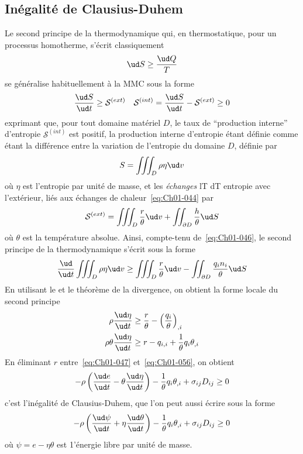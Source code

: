 \subsection{Inégalité de Clausius-Duhem} \label{ssec:Ch01-3.2}
Le second principe de la thermodynamique qui, en thermostatique, pour un processus homotherme, s'écrit classiquement
\begin{equation}
    \ud S \geq \frac{\ud Q}{T}
    \label{eq:Ch01-051}
\end{equation}
se généralise habituellement à la MMC sous la forme 
\begin{equation}
    \frac{\ud S}{\ud t} \geq \mathcal{S}^{(ext)} \quad \mathcal{S}^{(int)} = \frac{\ud S}{\ud t} - \mathcal{S}^{(ext)} \geq 0
    \label{eq:Ch01-052}
\end{equation}
exprimant que, pour tout domaine matériel $D$, le taux de ``production interne'' d'entropie $\mathcal{S}^{(int)}$ est positif, la production interne d'entropie étant définie comme étant la différence entre la variation de l'entropie du domaine $D$, définie par
\begin{equation}
    S = \iiint_{D} \rho \eta \ud v
    \label{eq:Ch01-053}
\end{equation}
où $\eta$ est l'entropie par unité de masse, et les \emph{échanges} lT dT entropie avec l'extérieur, liés aux échanges de chaleur~\eqref{eq:Ch01-044} par
\begin{equation}
    \mathcal{S}^{(ext)} = \iiint_{D} \frac{r}{\theta} \ud v + \iint_{\partial D} \frac{h}{\theta} \ud S
    \label{eq:Ch01-054}
\end{equation}
où $\theta$ est la température absolue.
Ainsi, compte-tenu de~\eqref{eq:Ch01-046}, le second principe de la thermodynamique s'écrit sous la forme
\begin{equation}
    \frac{\ud}{\ud t} \iiint_D \rho \eta \ud v \geq \iiint_{D} \frac{r}{\theta} \ud v - \iint_{\partial D} \frac{q_i n_i}{\theta} \ud S
    \label{eq:Ch01-055}
\end{equation}
En utilisant le  et le théorème de la divergence, on obtient la forme locale du second principe
\begin{align}
        \rho \frac{\ud \eta}{\ud t}  &\geq \frac{r}{\theta} - \left( \frac{q_i}{\theta} \right)_{,i} \nonumber\\
        \rho \theta \frac{\ud \eta}{\ud t}  &\geq r - q_{i,i} + \frac{1}{\theta} q_i\theta_{,i}
    \label{eq:Ch01-056}
\end{align}
En éliminant $r$ entre~\eqref{eq:Ch01-047} et~\eqref{eq:Ch01-056}, on obtient
\begin{equation}
    -\rho \left( \frac{\ud e}{\ud t} - \theta \frac{\ud \eta}{\ud t} \right) - \frac{1}{\theta}q_i \theta_{,i} + \sigma_{ij}D_{ij} \geq 0
    \label{eq:Ch01-057}
\end{equation}
c'est l'inégalité de Clausius-Duhem, que l'on peut aussi écrire sous la forme
\begin{equation}
    -\rho \left( \frac{\ud \psi}{\ud t} + \eta \frac{\ud \theta}{\ud t} \right) - \frac{1}{\theta}q_i \theta_{,i} + \sigma_{ij}D_{ij} \geq 0
    \label{eq:Ch01-058}
\end{equation}
où $\psi = e -\eta \theta$ est 1'énergie libre par unité de masse.


